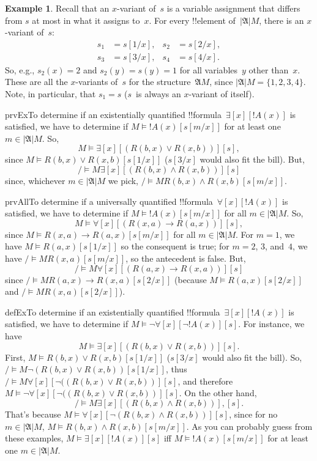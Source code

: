 \documentclass[10pt,a4paper]{article}
\theoremstyle{plain}
\theoremstyle{definition}
\newtheorem{ex}[thm]{Example}
\theoremstyle{remark}
\providecommand{\lif}{\mathbin{\rightarrow}}
\providecommand{\lforall}{\mathord{\forall}}
\providecommand{\lexists}{\mathord{\exists}}
\providecommand{\Subst}[3]{#1[#2/#3]}
\providecommand{\Struct}{\ensuremath{\mathfrak{A}}}
\providecommand{\Domain}{\ensuremath{|\mathfrak{A}|}}
\providecommand{\Sat}[2]{\ensuremath{#1 \models #2}}
\providecommand{\iftag}[1]{#1}
\providecommand{\iftag}{}
\begin{document}
\begin{ex}
Recall that an $x$-variant of~$s$ is a variable assignment that
differs from $s$ at most in what it assigns to~$x$. For every
!!{element} of~$\Domain{M}$, there is an $x$-variant of~$s$:
\begin{align*}
  s_1 & = \Subst{s}{1}{x}, &
  s_2 & = \Subst{s}{2}{x},\\
  s_3 & = \Subst{s}{3}{x}, &
  s_4 & = \Subst{s}{4}{x}.
\end{align*}
So, e.g., $s_2(x) = 2$ and $s_2(y) = s(y) = 1$ for all variables~$y$
other than~$x$. These are all the $x$-variants of~$s$ for the
structure~$\Struct{M}$, since $\Domain{M} = \{1, 2, 3, 4\}$. Note, in
particular, that $s_1 = s$ ($s$~is always an $x$-variant of itself).

\iftag{prvEx}{To determine if an existentially quantified
  !!{formula}~$\lexists[x][!A(x)]$ is satisfied, we have to determine
  if $\Sat{M}{!A(x)}[\Subst{s}{m}{x}]$ for at least one $m \in \Domain
  M$. So,
  \[
  \Sat{M}{\lexists[x][(R(b,x) \lor R(x,b))]}[s],
  \]
  since $\Sat{M}{R(b,x) \lor R(x, b)}[\Subst{s}{1}{x}]$
  ($\Subst{s}{3}{x}$ would also fit the bill).  But,
  \[
  \Sat/{M}{\lexists[x][(R(b,x) \land R(x,b))]}[s]
  \]
  since, whichever $m \in \Domain{M}$ we pick, $\Sat/{M}{R(b,x) \land R(x,b)}[\Subst{s}{m}{x}]$.}{}

\iftag{prvAll}{To determine if a universally quantified
  !!{formula}~$\lforall[x][!A(x)]$ is satisfied, we have to determine
  if $\Sat{M}{!A(x)}[\Subst{s}{m}{x}]$ for all $m \in \Domain M$. So,
  \[
  \Sat{M}{\lforall[x][(R(x,a) \lif R(a,x))]}[s],
  \]
  since $\Sat{M}{R(x,a) \lif R(a,x)}[\Subst{s}{m}{x}]$ for all $m \in
  \Domain M$. For $m = 1$, we have $\Sat{M}{R(a,x)}[\Subst{s}{1}{x}]$
  so the consequent is true; for $m = 2$, $3$, and~$4$, we have
  $\Sat/{M}{R(x,a)}[\Subst{s}{m}{x}]$, so the antecedent is false.
  But,
  \[
  \Sat/{M}{\lforall[x][(R(a,x) \lif R(x,a))]}[s]
  \]
  since $\Sat/{M}{R(a,x) \lif R(x,a)}[\Subst{s}{2}{x}]$ (because
  $\Sat{M}{R(a, x)}[\Subst{s}{2}{x}]$ and $\Sat/{M}{R(x,
  a)}[\Subst{s}{2}{x}]$).}{}

\iftag{defEx}{To determine if an existentially quantified
  !!{formula}~$\lexists[x][!A(x)]$ is satisfied, we have to determine
  if $\Sat{M}{\lnot \lforall[x][\lnot !A(x)]}[s]$. For instance, we
  have
  \[
  \Sat{M}{\lexists[x][(R(b,x) \lor R(x,b))]}[s].
  \]
  First, $\Sat{M}{R(b,x) \lor R(x, b)}[\Subst{s}{1}{x}]$
  ($\Subst{s}{3}{x}$ would also fit the bill).  So,
  $\Sat/{M}{\lnot(R(b,x) \lor R(x,b))}[\Subst{s}{1}{x}]$, thus
  $\Sat/{M}{\lforall[x][\lnot((R(b,x) \lor R(x,b))]}[s]$, and
  therefore $\Sat{M}{\lnot\lforall[x][\lnot((R(b,x) \lor
  R(x,b))]}[s]$. On the other hand,
  \[
  \Sat/{M}{\lexists[x][(R(b,x) \land R(x,b))],}[s].
  \]
  That's because $\Sat{M}{\lforall[x][\lnot(R(b,x) \land
  R(x,b))]}[s]$, since for no $m \in \Domain M$, $\Sat{M}{R(b,x) \land
  R(x,b)}[\Subst{s}{m}{x}]$. As you can probably guess from these
  examples, $\Sat{M}{\lexists[x][!A(x)]}[s]$ iff
  $\Sat{M}{!A(x)}[\Subst{s}{m}{x}]$ for at least one $m \in \Domain
  M$.}{}


\end{ex}
\end{document}
